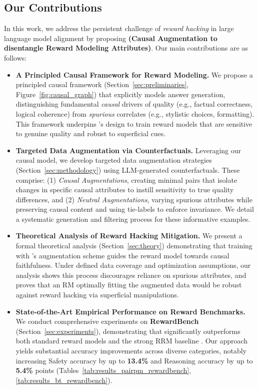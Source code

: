 \subsection{Our Contributions}
\label{subsec:our_contributions}

In this work, we address the persistent challenge of \emph{reward hacking} in large language model alignment by proposing \textbf{\carma{} (Causal Augmentation to disentangle Reward Modeling Attributes)}. Our main contributions are as follows:

\begin{itemize}[left=2pt,itemsep=0pt]
    \item \textbf{A Principled Causal Framework for Reward Modeling.}
    We propose a principled causal framework (Section~\ref{sec:preliminaries}, Figure~\ref{fig:causal_graph}) that explicitly models answer generation, distinguishing fundamental \emph{causal} drivers of quality (e.g., factual correctness, logical coherence) from \emph{spurious} correlates (e.g., stylistic choices, formatting). This framework underpins \carma{}'s design to train reward models that are sensitive to genuine quality and robust to superficial cues.

    \item \textbf{Targeted Data Augmentation via Counterfactuals.}
    Leveraging our causal model, we develop targeted data augmentation strategies (Section~\ref{sec:methodology}) using LLM-generated counterfactuals. These comprise: (1) \emph{Causal Augmentations}, creating minimal pairs that isolate changes in specific causal attributes to instill sensitivity to true quality differences, and (2) \emph{Neutral Augmentations}, varying spurious attributes while preserving causal content and using tie-labels to enforce invariance. We detail a systematic generation and filtering process for these informative examples.

    \item \textbf{Theoretical Analysis of Reward Hacking Mitigation.}
    We present a formal theoretical analysis (Section~\ref{sec:theory}) demonstrating that training with \carma{}'s augmentation scheme guides the reward model towards causal faithfulness. Under defined data coverage and optimization assumptions, our analysis shows this process discourages reliance on spurious attributes, and proves that an RM optimally fitting the augmented data would be robust against reward hacking via superficial manipulations.

    \item \textbf{State-of-the-Art Empirical Performance on Reward Benchmarks.}
    We conduct comprehensive experiments on \textbf{RewardBench} (Section~\ref{sec:experiments}), demonstrating that \carma{} significantly outperforms both standard reward models and the strong RRM baseline \citep{liu2024rrm}. Our approach yields substantial accuracy improvements across diverse categories, notably increasing Safety accuracy by up to \textbf{13.4\%} and Reasoning accuracy by up to \textbf{5.4\%} points (Tables~\ref{tab:results_pairpm_rewardbench}, \ref{tab:results_bt_rewardbench}).


\end{itemize}
